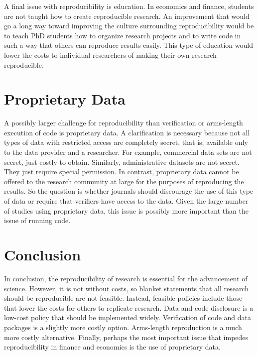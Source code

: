 \documentclass[12pt, oneside]{article}
\begin{document}
A final issue with reproducibility is education. In economics and finance, students are not taught how to create reproducible research. An improvement that would go a long way toward improving the culture surrounding reproducibility would be to teach PhD students how to organize research projects and to write code in such a way that others can reproduce results easily. This type of education would lower the costs to individual researchers of making their own research reproducible. 

\section{Proprietary Data} 

A possibly larger challenge for reproducibility than verification or arms-length execution of code is proprietary data.  A clarification is necessary because not all types of data with restricted access are completely secret, that is, available only to the data provider and a researcher.  For example, commercial data sets are not secret, just costly to obtain. Similarly, administrative datasets are not secret. They just require special permission. In contrast, proprietary data cannot be offered to the research community at large for the purposes of reproducing the results.  So the question is whether journals should discourage the use of this type of data or require that verifiers have access to the data. Given the large number of studies using proprietary data, this issue is possibly more important than the issue of running code. 

\section{Conclusion} 

In conclusion, the reproducibility of research is essential for the advancement of science. However, it is not without costs, so blanket statements that all research should be reproducible are not feasible. Instead, feasible policies include those that lower the costs for others to replicate research. Data and code disclosure is a low-cost policy that should be implemented widely. Verification of code and data packages is a slightly more costly option. Arms-length reproduction is a much more costly alternative.  Finally, perhaps the most important issue that impedes reproducibility in finance and economics is the use of proprietary data. 
\end{document}
